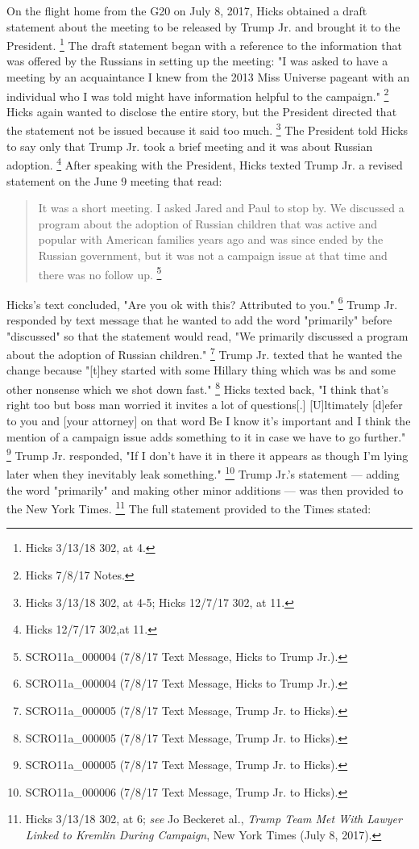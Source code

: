 {On the flight home from the G20 on July 8, 2017, Hicks obtained a draft statement about the meeting to be released by Trump Jr. and brought it to the President.%
\footnote{Hicks 3/13/18 302, at 4.}
The draft statement began with a reference to the information that was offered by the Russians in setting up the meeting: "I was asked to have a meeting by an acquaintance I knew from the 2013 Miss Universe pageant with an individual who I was told might have information helpful to the campaign."%
\footnote{Hicks 7/8/17 Notes.}
Hicks again wanted to disclose the entire story, but the President directed that the statement not be
issued because it said too much.%
\footnote{Hicks 3/13/18 302, at 4-5;
Hicks 12/7/17 302, at 11.}
The President told Hicks to say only that Trump Jr. took a brief meeting and it was about Russian adoption.%
\footnote{Hicks 12/7/17 302,at 11.}
After speaking with the President, Hicks texted Trump Jr. a revised statement on the June 9 meeting that read:

\begin{quote}
It was a short meeting.
I asked Jared and Paul to stop by.
We discussed a program about the adoption of Russian children that was active and popular with American families years ago and was since ended by the Russian government, but it was not a campaign issue at that time and there was no follow up.%
\footnote{SCRO11a\_000004 (7/8/17 Text Message, Hicks to Trump Jr.).}
\end{quote}

Hicks's text concluded, "Are you ok with this? Attributed to you."%
\footnote{SCRO11a\_000004 (7/8/17 Text Message, Hicks to Trump Jr.).}
Trump Jr. responded by text message that he wanted to add the word "primarily" before "discussed" so that the statement would read, "We primarily discussed a program about the adoption of Russian children."%
\footnote{SCRO11a\_000005 (7/8/17 Text Message, Trump Jr. to Hicks).}
Trump Jr. texted that he wanted the change because "[t]hey started with some Hillary thing which was bs and some other nonsense which we shot down fast."%
\footnote{SCRO11a\_000005 (7/8/17 Text Message, Trump Jr. to Hicks).}
Hicks texted back, "I think that's right too but boss man worried it invites a lot of questions[.]
[U]ltimately [d]efer to you and [your attorney] on that word Be I know it's important and I think the mention of a campaign issue adds something to it in case we have to go further."%
\footnote{SCRO11a\_000005 (7/8/17 Text Message, Trump Jr. to Hicks).}
Trump Jr. responded, "If I don't have it in there it appears as though I'm lying later when they inevitably leak something."%
\footnote{SCRO11a\_000006 (7/8/17 Text Message, Trump Jr. to Hicks).}
Trump Jr.'s statement — adding the word "primarily" and making other minor additions — was then provided to the New York Times.%
\footnote{Hicks 3/13/18 302, at 6;
\textit{see} Jo Beckeret al., \textit{Trump Team Met With Lawyer Linked to Kremlin During Campaign}, New York Times (July 8, 2017).}
The full statement provided to the Times stated:

}
